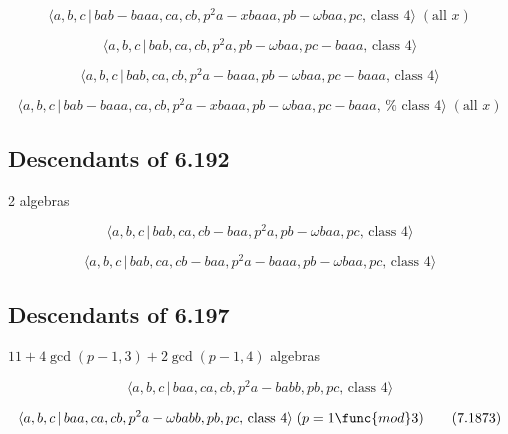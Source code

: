 \documentclass[10pt]{article}
\begin{document}
\begin{equation}
\langle a,b,c\,|\,bab-baaa,ca,cb,p^{2}a-xbaaa,pb-\omega baa,pc,\,\text{class 
}4\rangle \;(\text{all }x)  \tag{7.1866}
\end{equation}

\begin{equation}
\langle a,b,c\,|\,bab,ca,cb,p^{2}a,pb-\omega baa,pc-baaa,\,\text{class }%
4\rangle  \tag{7.1867}
\end{equation}

\begin{equation}
\langle a,b,c\,|\,bab,ca,cb,p^{2}a-baaa,pb-\omega baa,pc-baaa,\,\text{class }%
4\rangle  \tag{7.1868}
\end{equation}

\begin{equation}
\langle a,b,c\,|\,bab-baaa,ca,cb,p^{2}a-xbaaa,pb-\omega baa,pc-baaa,\,\text{%
class }4\rangle \;(\text{all }x)  \tag{7.1869}
\end{equation}

\subsection{Descendants of 6.192}

2 algebras

\begin{equation}
\langle a,b,c\,|\,bab,ca,cb-baa,p^{2}a,pb-\omega baa,pc,\,\text{class }%
4\rangle  \tag{7.1870}
\end{equation}

\begin{equation}
\langle a,b,c\,|\,bab,ca,cb-baa,p^{2}a-baaa,pb-\omega baa,pc,\,\text{class }%
4\rangle  \tag{7.1871}
\end{equation}

\subsection{Descendants of 6.197}

$11+4\gcd (p-1,3)+2\gcd (p-1,4)$ algebras

\begin{equation}
\langle a,b,c\,|\,baa,ca,cb,p^2a-babb,pb,pc,\,\text{class }4\rangle 
\tag{7.1872}
\end{equation}

\begin{equation}
\langle a,b,c\,|\,baa,ca,cb,p^{2}a-\omega babb,pb,pc,\,\text{class }4\rangle
\;(p=1\func{mod}3)  \tag{7.1873}
\end{equation}
\end{document}
